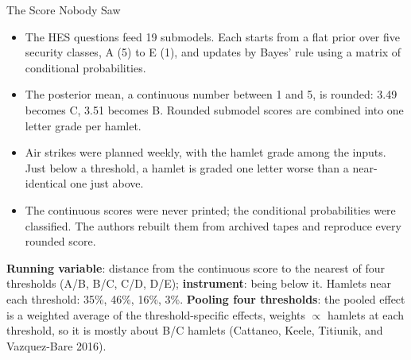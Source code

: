 \documentclass[aspectratio=169,11pt,xcolor=dvipsnames]{beamer}
\newcommand{\srcp}[1]{{\scriptsize\color{gray}(#1)}}
\begin{document}
\begin{frame}{The Score Nobody Saw}
\small
\begin{itemize}\itemsep1pt
  \item The HES questions feed 19 submodels. Each starts from a flat prior over
        five security classes, A (5) to E (1), and updates by Bayes' rule using
        a matrix of conditional probabilities.
  \item The \alert{posterior mean}, a continuous number between 1 and 5, is
        \alert{rounded}: 3.49 becomes C, 3.51 becomes B. Rounded submodel scores
        are combined into one letter grade per hamlet.
  \item Air strikes were planned weekly, with the hamlet grade among the inputs.
        Just below a threshold, a hamlet is graded one letter worse than a
        near-identical one just above.
  \item The continuous scores were never printed; the conditional probabilities
        were classified. The authors rebuilt them from archived tapes and
        reproduce every rounded score.
\end{itemize}
\textbf{Running variable}: distance from the continuous score to the nearest of
four thresholds (A/B, B/C, C/D, D/E); \textbf{instrument}: being below it.
Hamlets near each threshold: 35\%, 46\%, 16\%, 3\%.
{\footnotesize\textbf{Pooling four thresholds}: the pooled effect is a weighted average of the
threshold-specific effects, weights $\propto$ hamlets at each threshold, so it
is mostly about B/C hamlets \srcp{Cattaneo, Keele, Titiunik, and Vazquez-Bare 2016}.}
\end{frame}
\end{document}
